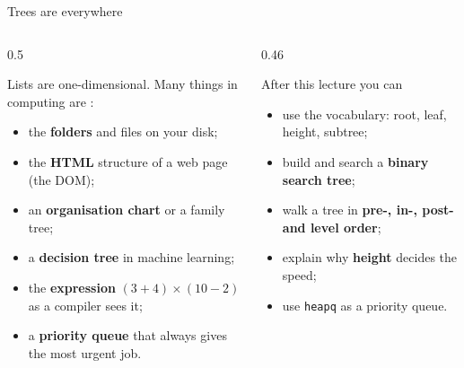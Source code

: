 \documentclass[aspectratio=169,10pt]{beamer}
\begin{document}
\begin{frame}[plain]\titlepage\end{frame}

\begin{frame}{Trees are everywhere}
\begin{columns}[T]
\begin{column}{0.5\textwidth}
{\small
Lists are one-dimensional. Many things in computing are :
\begin{itemize}\setlength\itemsep{3pt}
\item the \textbf{folders} and files on your disk;
\item the \textbf{HTML} structure of a web page (the DOM);
\item an \textbf{organisation chart} or a family tree;
\item a \textbf{decision tree} in machine learning;
\item the \textbf{expression} $(3+4)\times(10-2)$ as a compiler sees it;
\item a \textbf{priority queue} that always gives the most urgent job.
\end{itemize}}
\end{column}
\begin{column}{0.46\textwidth}
\begin{block}{After this lecture you can}
{\small
\begin{itemize}\setlength\itemsep{2pt}
\item use the vocabulary: root, leaf, height, subtree;
\item build and search a \textbf{binary search tree};
\item walk a tree in \textbf{pre-, in-, post- and level order};
\item explain why \textbf{height} decides the speed;
\item use \texttt{heapq} as a priority queue.
\end{itemize}}
\end{block}
\end{column}
\end{columns}
\end{frame}
\end{document}
